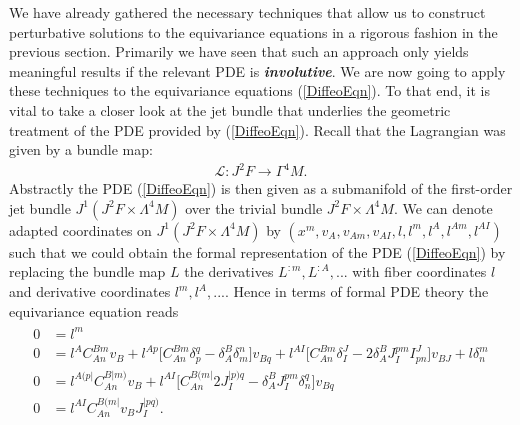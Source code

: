 We have already gathered the necessary techniques that allow us to construct perturbative solutions to the equivariance equations in a rigorous fashion in the previous section. Primarily we have seen that such an approach only yields meaningful results if the relevant PDE is \textit{\textbf{involutive}}. We are now going to apply these techniques to the equivariance equations (\ref{DiffeoEqn}). To that end, it is vital to take a closer look at the jet bundle that underlies the geometric treatment of the PDE provided by (\ref{DiffeoEqn}). Recall that the Lagrangian was given by a bundle map:
\begin{align}
\mathcal{L} : J^2F \longrightarrow \Gamma^4M.
\end{align}
Abstractly the PDE (\ref{DiffeoEqn}) is then given as a submanifold of the first-order jet bundle $J^1(J^2F \times \Lambda^4M)$ over the trivial bundle $J^2F \times \Lambda^4M$. 
We can denote adapted coordinates on $J^1(J^2F \times \Lambda^4M)$ by $(x^m,v_A,v_{Am},v_{AI},l,l^{m},l^{A},l^{Am},l^{AI})$ such that we could obtain the formal representation of the PDE (\ref{DiffeoEqn}) by replacing the bundle map $L$ the derivatives $L^{:m},L^{:A},...$ with fiber coordinates $l$ and derivative coordinates $l^m,l^A,...$. Hence in terms of formal PDE theory the equivariance equation reads 
\begin{align}\label{DiffeoEqnFormal}
\begin{aligned}
    0 &= l^{m} \\
    0 &= l^{A} C_{An}^{Bm} v_B + l^{Ap} \bigl[ C_{An}^{Bm} \delta_p^q - \delta_A^B \delta_m^n \bigr] v_{Bq} + l^{AI} \bigl[ C_{An}^{Bm} \delta_I^J - 2 \delta_A^B J_I^{pm} I^J_{pn}  \bigr] v_{BJ} + l \delta^m_n \\
    0 &= l^{A(p\vert}C_{An}^{B \vert m)} v_B + l^{ AI} \bigl[ C_{An}^{B(m\vert} 2 J_I^{\vert p) q} - \delta^B_A J_I ^{pm} \delta_n^q \bigr] v_{Bq} \\
    0 &= l^{AI} C_{An}^{B(m\vert} v_B J_I^{\vert p q )}.
    \end{aligned}
\end{align}

